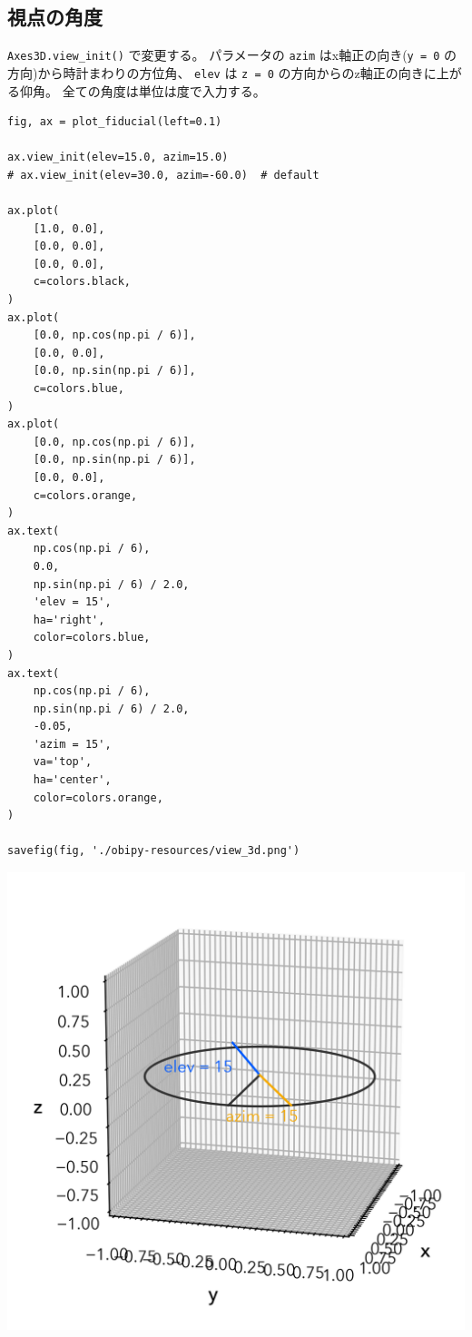 \documentclass[a4paper, 10pt, notitlepage, twocolumn, uplatex, oneside, dvipdfmx]{jsarticle}
\begin{document}
\subsection{視点の角度}
\label{sec:org3635a09}
\texttt{Axes3D.view\_init()} で変更する。
パラメータの \texttt{azim} はx軸正の向き(\texttt{y = 0} の方向)から時計まわりの方位角、
\texttt{elev} は \texttt{z = 0} の方向からのz軸正の向きに上がる仰角。
全ての角度は単位は度で入力する。
\begin{verbatim}
fig, ax = plot_fiducial(left=0.1)

ax.view_init(elev=15.0, azim=15.0)
# ax.view_init(elev=30.0, azim=-60.0)  # default

ax.plot(
    [1.0, 0.0],
    [0.0, 0.0],
    [0.0, 0.0],
    c=colors.black,
)
ax.plot(
    [0.0, np.cos(np.pi / 6)],
    [0.0, 0.0],
    [0.0, np.sin(np.pi / 6)],
    c=colors.blue,
)
ax.plot(
    [0.0, np.cos(np.pi / 6)],
    [0.0, np.sin(np.pi / 6)],
    [0.0, 0.0],
    c=colors.orange,
)
ax.text(
    np.cos(np.pi / 6),
    0.0,
    np.sin(np.pi / 6) / 2.0,
    'elev = 15',
    ha='right',
    color=colors.blue,
)
ax.text(
    np.cos(np.pi / 6),
    np.sin(np.pi / 6) / 2.0,
    -0.05,
    'azim = 15',
    va='top',
    ha='center',
    color=colors.orange,
)

savefig(fig, './obipy-resources/view_3d.png')
\end{verbatim}

\label{}
\begin{center}
\includegraphics[width=1.0\linewidth]{./obipy-resources/view_3d.png}
\end{center}
\end{document}
